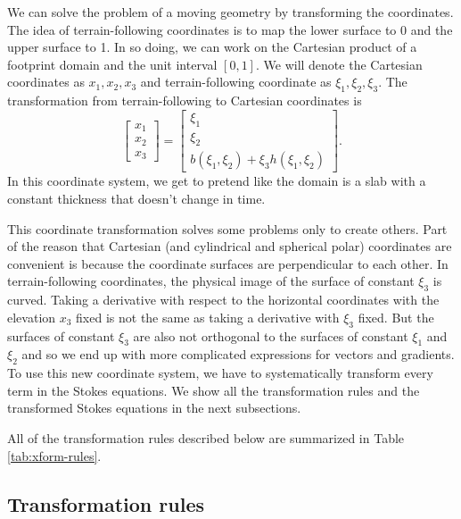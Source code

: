 \documentclass[gmd, manuscript]{copernicus}
\begin{document}
We can solve the problem of a moving geometry by transforming the coordinates.
The idea of terrain-following coordinates is to map the lower surface to 0 and the upper surface to 1.
In so doing, we can work on the Cartesian product of a footprint domain and the unit interval $[0, 1]$.
We will denote the Cartesian coordinates as $x_1, x_2, x_3$ and terrain-following coordinate as $\xi_1, \xi_2, \xi_3$.
The transformation from terrain-following to Cartesian coordinates is
\begin{equation}
    \left[\begin{matrix}x_1 \\ x_2 \\ x_3\end{matrix}\right] = \left[\begin{matrix}\xi_1 \\ \xi_2 \\ b(\xi_1, \xi_2) + \xi_3h(\xi_1, \xi_2)\end{matrix}\right].
    \label{eq:explicit-tfc}
\end{equation}
In this coordinate system, we get to pretend like the domain is a slab with a constant thickness that doesn't change in time.

This coordinate transformation solves some problems only to create others.
Part of the reason that Cartesian (and cylindrical and spherical polar) coordinates are convenient is because the coordinate surfaces are perpendicular to each other.
In terrain-following coordinates, the physical image of the surface of constant $\xi_3$ is curved.
Taking a derivative with respect to the horizontal coordinates with the elevation $x_3$ fixed is not the same as taking a derivative with $\xi_3$ fixed.
But the surfaces of constant $\xi_3$ are also not orthogonal to the surfaces of constant $\xi_1$ and $\xi_2$ and so we end up with more complicated expressions for vectors and gradients.
To use this new coordinate system, we have to systematically transform every term in the Stokes equations.
We show all the transformation rules and the transformed Stokes equations in the next subsections.

All of the transformation rules described below are summarized in Table \ref{tab:xform-rules}.


\subsection{Transformation rules}\label{subsec:xform-rules}
\end{document}

